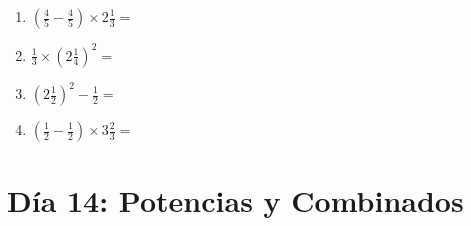 \documentclass[12pt]{article}
\begin{document}
\begin{enumerate}
\item \large $ \left( \frac{4}{5} - \frac{4}{5} \right) \times 2 \frac{1}{3} = $ \vspace{1.6cm}
\item \large $ \frac{1}{3} \times \left( 2 \frac{1}{4} \right)^2 = $ \vspace{1.6cm}
\item \large $ \left( 2 \frac{1}{2} \right)^2 - \frac{1}{2} = $ \vspace{1.6cm}
\item \large $ \left( \frac{1}{2} - \frac{1}{2} \right) \times 3 \frac{2}{3} = $ \vspace{1.6cm}
\end{enumerate}\newpage
\section*{Día 14: Potencias y Combinados}
\end{document}
